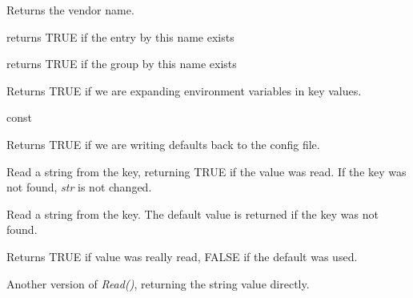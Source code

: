 \label{wxconfigbasegetvendorname}


Returns the vendor name.

\label{wxconfigbasehasentry}


returns TRUE if the entry by this name exists

\label{wxconfigbasehasgroup}


returns TRUE if the group by this name exists

\label{wxconfigbaseisexpandingenvvars}


Returns TRUE if we are expanding environment variables in key values.

\label{wxconfigbaseisrecordingdefaults}

 const

Returns TRUE if we are writing defaults back to the config file.

\label{wxconfigbaseread}


Read a string from the key, returning TRUE if the value was read. If the key
was not found, {\it str} is not changed.


Read a string from the key. The default value is returned if the key was not
found.

Returns TRUE if value was really read, FALSE if the default was used.


Another version of {\it Read()}, returning the string value directly.


